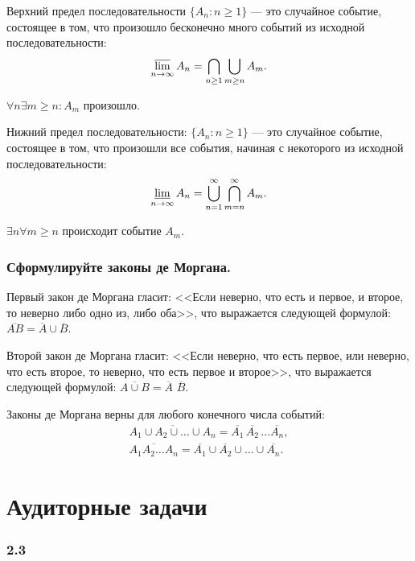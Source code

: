 Верхний предел последовательности $ \{ A_n : n \geq 1 \} $ --- это случайное событие,
состоящее в том, что произошло бесконечно много событий из исходной последовательности:
$$ \varlimsup \limits_{ n \to \infty } A_n =
\bigcap \limits_{n \geq 1} \bigcup \limits_{ m \geq n } A_m.$$

$ \forall n \exists m \geq n : A_m $ произошло.

Нижний предел последовательности:
$ \{ A_n : n \geq 1 \} $ --- это случайное событие, состоящее в том, что произошли все события, начиная с некоторого из исходной последовательности:
$$ \varliminf \limits_{ n \to \infty } A_n =
\bigcup \limits_{ n = 1 }^\infty \bigcap \limits_{ m = n }^\infty A_m.$$

$ \exists n \forall m \geq n $ происходит событие $A_m$.

\subsubsection*{Сформулируйте законы де Моргана.}

Первый закон де Моргана гласит: <<Если неверно, что есть и первое, и второе, то неверно либо одно из, либо оба>>, что выражается следующей формулой:
$ \overline{ AB } = \overline{ A } \cup \overline{ B }$.

Второй закон де Моргана гласит: <<Если неверно, что есть первое, или неверно, что есть второе, то неверно, что есть первое и второе>>, что выражается следующей формулой:
$ \overline{ A \cup B} = \overline{ A }$ $ \overline{ B }$.

Законы де Моргана верны для любого конечного числа событий:
\begin{equation*}
\begin{split}
\overline{ A_1 \cup A_2 \cup \dotsc \cup A_n } =
\overline{ A_1 } \, \overline{ A_2 } \, \dotsc \overline{ A_n }, \\
\overline{ A_1 A_2 \dotsc A_n } =
\overline{ A_1 } \cup \overline{ A_2 } \cup \dotsc \cup \overline{ A_n }.
\end{split}
\end{equation*}

\section*{Аудиторные задачи}

\subsubsection*{2.3}

